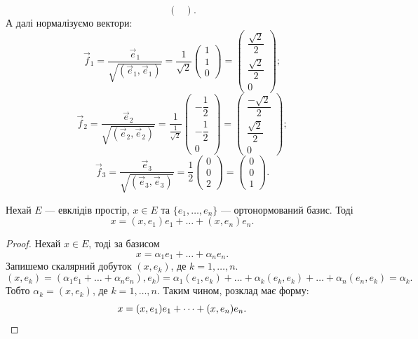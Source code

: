 \documentclass{math_library}
\begin{document}
\begin{example}
\[\begin{pmatrix}
\end{pmatrix}.
\]
А далі нормалізуємо вектори:
\[
\vec{f}_1 = \dfrac{\vec{e}_1}{\sqrt{(\vec{e}_1,\vec{e}_1)}} = \dfrac{1}{\sqrt{2}} \begin{pmatrix}
1 \\ 1 \\ 0
\end{pmatrix} = \begin{pmatrix}
\dfrac{\sqrt{2}}{2} \\ \dfrac{\sqrt{2}}{2} \\ 0
\end{pmatrix};
\]
\[
\vec{f}_2 = \dfrac{\vec{e}_2}{\sqrt{(\vec{e}_2,\vec{e}_2)}} = \dfrac{1}{\frac{1}{\sqrt{2}}} \begin{pmatrix}
-\dfrac{1}{2} \\ -\dfrac{1}{2} \\ 0
\end{pmatrix} = \begin{pmatrix}
\dfrac{-\sqrt{2}}{2} \\ \dfrac{\sqrt{2}}{2} \\ 0
\end{pmatrix};
\]
\[
\vec{f}_3 = \dfrac{\vec{e}_3}{\sqrt{(\vec{e}_3,\vec{e}_3)}} = \dfrac{1}{2} \begin{pmatrix}
0 \\ 0 \\ 2
\end{pmatrix} = \begin{pmatrix}
0 \\ 0 \\ 1
\end{pmatrix}.
\]
\end{example}

\begin{lemma}
Нехай $E$ --- евклідів простір, $x \in E$ та $\{e_1,\dots,e_n\}$ --- ортонормований базис. Тоді 
\[
x = (x,e_1) e_1 + \dots + (x,e_n) e_n.
\]
\end{lemma}

\begin{proof}
Нехай $x \in E$, тоді за базисом 
\[
x = \alpha_1 e_1 + \dots + \alpha_n e_n.
\]
Запишемо скалярний добуток $(x,e_k)$, де $k = 1,\dots,n$.
\[
(x,e_k) = (\alpha_1 e_1 + \dots + \alpha_n e_n), e_k) = \alpha_1 (e_1,e_k) + \dots + \alpha_k (e_k,e_k) + \dots + \alpha_n (e_n,e_k) = \alpha_k.
\]
Тобто $\alpha_k = (x,e_k)$, де $k = 1,\dots,n$. Таким чином, розклад має форму:
\[
x = (x,e_1) e_1 + \dots + (x,e_n) e_n. \qedhere
\]
\end{proof}
\end{document}
